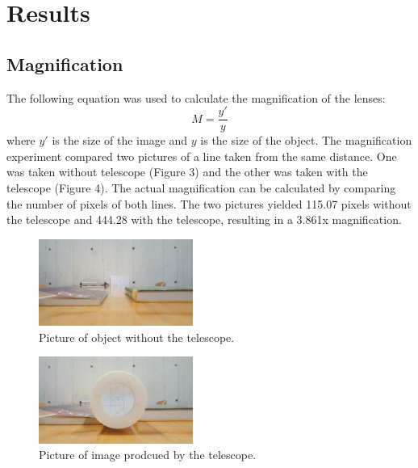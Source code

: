 \section{Results}
\label{sec:Results}

\subsection{Magnification}
The following equation was used to calculate the magnification of the lenses:
\begin{equation}
  M = \dfrac{y'}{y}
\end{equation}
where $y'$ is the size of the image and $y$ is the size of the object. The magnification experiment compared two pictures of a line taken from the same distance. One was taken without telescope (Figure 3) and the other was taken with the telescope (Figure 4). The actual magnification can be calculated by comparing the number of pixels of both lines. The two pictures yielded 115.07 pixels without the telescope and 444.28 with the telescope, resulting in a 3.861x magnification.


\begin{figure}[!h] \label{fig:no mag}
  \begin{centering}
    \includegraphics[width=0.45\textwidth]{./Figures/no_mag.pdf}
    \caption{Picture of object without the telescope.}
  \end{centering}
\end{figure}

\begin{figure}[!h]
  \begin{centering}
    \includegraphics[width=0.45\textwidth]{./Figures/telescope_mag.pdf}
    \caption{Picture of image prodcued by the telescope.}
  \end{centering}
\end{figure}

